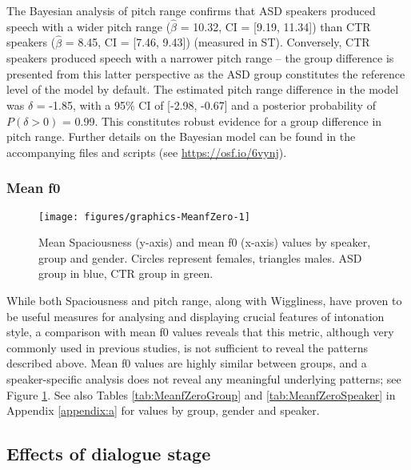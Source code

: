 The Bayesian analysis of pitch range confirms that ASD speakers produced speech with a wider pitch range (\(\hat{\beta}\) = 10.32, CI = {[}9.19, 11.34{]}) than CTR speakers (\(\hat{\beta}\) = 8.45, CI = {[}7.46, 9.43{]}) (measured in ST).
Conversely, CTR speakers produced speech with a narrower pitch range -- the group difference is presented from this latter perspective as the ASD group constitutes the reference level of the model by default. The estimated pitch range difference in the model was \(\delta\) = -1.85, with a 95\% CI of {[}-2.98, -0.67{]} and a posterior probability of \(P(\delta > 0)\) = 0.99. This constitutes robust evidence for a group difference in pitch range. Further details on the Bayesian model can be found in the accompanying files and scripts (see \url{https://osf.io/6vynj}).



\subsubsection{Mean f0}\label{int_results_overall_comparison_meanfzero}




\begin{figure}
	
	{\texttt{[image: figures/graphics-MeanfZero-1]}
		
	}
	
	\caption{Mean Spaciousness (y-axis) and mean f0 (x-axis) values by speaker, group and gender. Circles represent females, triangles males. ASD group in blue, CTR group in green.}\label{fig:MeanfZero}
\end{figure}

While both Spaciousness and pitch range, along with Wiggliness, have proven to be useful measures for analysing and displaying crucial features of intonation style, a comparison with mean f0 values reveals that this metric, although very commonly used in previous studies, is not sufficient to reveal the patterns described above. Mean f0 values are highly similar between groups, and a speaker-specific analysis does not reveal any meaningful underlying patterns; see Figure \ref{fig:MeanfZero}. See also Tables \ref{tab:MeanfZeroGroup} and \ref{tab:MeanfZeroSpeaker} in Appendix \ref{appendix:a} for values by group, gender and speaker.

	\subsection{Effects of dialogue stage}\label{int_results_stage}


